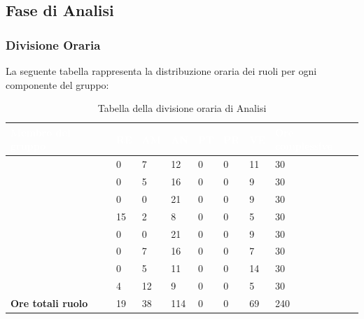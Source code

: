 \subsection{Fase di Analisi}

\subsubsection{Divisione Oraria}
La seguente tabella rappresenta la distribuzione oraria dei ruoli per ogni componente del gruppo:
{
\renewcommand{\arraystretch}{2}
\centering
\begin{longtable}[h!] { C{4cm} C{1cm} C{1cm} C{1cm} C{1cm} C{1cm} C{1cm} C{3cm}}
\caption{Tabella della divisione oraria di Analisi}	\\

\textcolor{white}{\textbf{Membro del gruppo}} & 
\textcolor{white}{\textbf{RE}} & 
\textcolor{white}{\textbf{AM}} & 
\textcolor{white}{\textbf{AN}} & 
\textcolor{white}{\textbf{PT}} & 
\textcolor{white}{\textbf{PR}} & 
\textcolor{white}{\textbf{VE}} & 
\textcolor{white}{\textbf{Ore complessive}}\\	
\endhead

\MC{}                     &  0 &  7 &  12 & 0 & 0 & 11 &  30 \\
\LD{}                     &  0 &  5 &  16 & 0 & 0 &  9 &  30 \\
\CE{}                     &  0 &  0 &  21 & 0 & 0 &  9 &  30 \\
\SE{}                     & 15 &  2 &   8 & 0 & 0 &  5 &  30 \\
\PF{}                     &  0 &  0 &  21 & 0 & 0 &  9 &  30 \\
\DF{}                     &  0 &  7 &  16 & 0 & 0 &  7 &  30 \\
\BR{}                     &  0 &  5 &  11 & 0 & 0 & 14 &  30 \\
\AT{}                     &  4 & 12 &   9 & 0 & 0 &  5 &  30 \\
\textbf{Ore totali ruolo} & 19 & 38 & 114 & 0 & 0 & 69 & 240 \\

\end{longtable}
}

